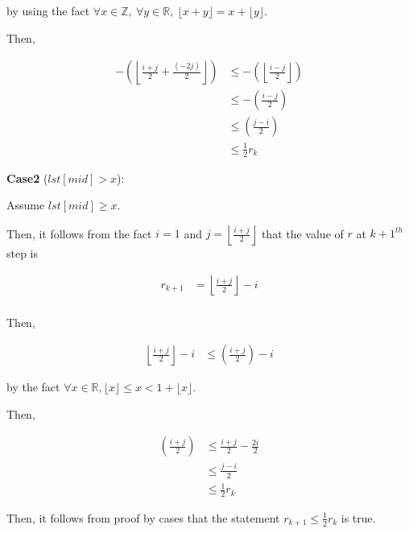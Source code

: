 \documentclass[12pt]{article}
\begin{document}
\begin{enumerate}[a.]
    by using the fact $\forall x \in \mathbb{Z},\:\forall y \in \mathbb{R},\:
    \lfloor x+y \rfloor = x + \lfloor y \rfloor$.

    \bigskip

    Then,

    \begin{align}
        - \left( \left\lfloor \frac{i + j}{2} + \frac{(-2j)}{2} \right\rfloor \right) &\leq - \left( \left\lfloor \frac{i - j}{2} \right\rfloor \right)\\
        &\leq - \left( \frac{i - j}{2} \right)\\
        &\leq \left( \frac{j - i}{2} \right)\\
        &\leq \frac{1}{2} r_k
    \end{align}

    \bigskip

    \textbf{Case2} ($lst[mid]> x$):

    \bigskip

    Assume $lst[mid] \geq x$.

    \bigskip

    Then, it follows from the fact $i = 1$ and $j = \left\lfloor \frac{i+j}{2} \right\rfloor$
    that the value of $r$ at $k+1^{th}$ step is

    \begin{align}
        r_{k+1} &= \left\lfloor \frac{i+j}{2} \right\rfloor - i\\
    \end{align}

    \bigskip

    Then,

    \begin{align}
        \left\lfloor \frac{i+j}{2} \right\rfloor - i &\leq \left( \frac{i+j}{2} \right) - i
    \end{align}

    by the fact $\forall x \in \mathbb{R}, \lfloor x \rfloor \leq x < 1 + \lfloor x \rfloor$.

    \bigskip

    Then,

    \begin{align}
        \left( \frac{i+j}{2} \right) &\leq \frac{i + j}{2} - \frac{2i}{2}\\
        &\leq \frac{j - i}{2}\\
        &\leq \frac{1}{2} r_k
    \end{align}


    Then, it follows from proof by cases that the statement $r_{k+1} \leq \frac{1}{2} r_k$
    is true.


\end{enumerate}
\end{document}
